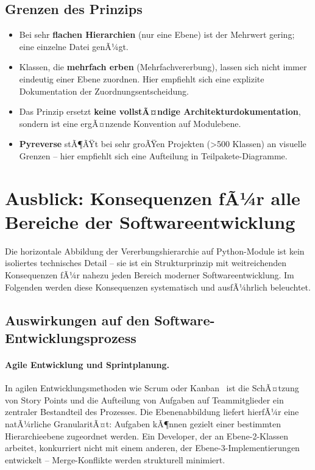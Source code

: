 ﻿\documentclass[a4paper,12pt]{article}
\begin{document}
\subsection{Grenzen des Prinzips}

\begin{itemize}[leftmargin=*]
	\item Bei sehr \textbf{flachen Hierarchien} (nur eine Ebene) ist der Mehrwert
	gering; eine einzelne Datei genÃ¼gt.
	\item Klassen, die \textbf{mehrfach erben} (Mehrfachvererbung), lassen sich
	nicht immer eindeutig einer Ebene zuordnen. Hier empfiehlt sich eine
	explizite Dokumentation der Zuordnungsentscheidung.
	\item Das Prinzip ersetzt \textbf{keine vollstÃ¤ndige Architekturdokumentation},
	sondern ist eine ergÃ¤nzende Konvention auf Modulebene.
	\item \textbf{Pyreverse} stÃ¶ÃŸt bei sehr groÃŸen Projekten (>500 Klassen) an
	visuelle Grenzen -- hier empfiehlt sich eine Aufteilung in
	Teilpakete-Diagramme.
\end{itemize}

\section{Ausblick: Konsequenzen fÃ¼r alle Bereiche der Softwareentwicklung}
\label{sec:ausblick}

Die horizontale Abbildung der Vererbungshierarchie auf Python-Module ist kein
isoliertes technisches Detail -- sie ist ein Strukturprinzip mit weitreichenden
Konsequenzen fÃ¼r nahezu jeden Bereich moderner Softwareentwicklung. Im Folgenden
werden diese Konsequenzen systematisch und ausfÃ¼hrlich beleuchtet.

\subsection{Auswirkungen auf den Software-Entwicklungsprozess}

\paragraph{Agile Entwicklung und Sprintplanung.}
In agilen Entwicklungsmethoden wie Scrum oder Kanban~\cite{sutherland2014} ist
die SchÃ¤tzung von Story Points und die Aufteilung von Aufgaben auf Teammitglieder
ein zentraler Bestandteil des Prozesses. Die Ebenenabbildung liefert hierfÃ¼r
eine natÃ¼rliche GranularitÃ¤t: Aufgaben kÃ¶nnen gezielt einer bestimmten
Hierarchieebene zugeordnet werden. Ein Developer, der an Ebene-2-Klassen
arbeitet, konkurriert nicht mit einem anderen, der Ebene-3-Implementierungen
entwickelt -- Merge-Konflikte werden strukturell minimiert.
\end{document}
